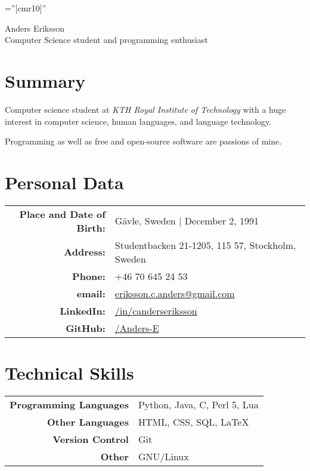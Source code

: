\documentclass[a4paper,10pt]{article}
\begin{document}
\pagestyle{empty} %

\font\fb=''[cmr10]'' %

\par{
    \centering
	{
	    \Huge \bitter Anders Eriksson \\
	    \normalfont
	    \normalsize Computer Science student and programming enthusiast
	}
	\bigskip\par
}

\section{Summary}
Computer science student at \emph{KTH Royal Institute of Technology} with a huge interest in computer science, human languages, and language technology.

Programming as well as free and open-source software are passions of mine.

\section{Personal Data}

\begin{tabular}{rl}
    \textbf{Place and Date of Birth:} & Gävle, Sweden  | December 2, 1991 \\
    \textbf{Address:}   & Studentbacken 21-1205, 115 57, Stockholm, Sweden \\
    \textbf{Phone:}     & +46 70 645 24 53\\
    \textbf{email:}     & \href{mailto:eriksson.c.anders@gmail.com
}{eriksson.c.anders@gmail.com}\\
    \textbf{LinkedIn:}	& \href{http://se.linkedin.com/in/canderseriksson}{/in/canderseriksson}\\
    \textbf{GitHub:}	& \href{http://github.com/Anders-E}{/Anders-E}
\end{tabular}

\section{Technical Skills}
\begin{tabular}{r|l}
\textbf{Programming Languages} & Python, Java, C, Perl 5, Lua \\
\textbf{Other Languages} & HTML, CSS, SQL, \LaTeX \\
\textbf{Version Control} & Git \\
\textbf{Other} & GNU/Linux\\
\end{tabular}
\end{document}

